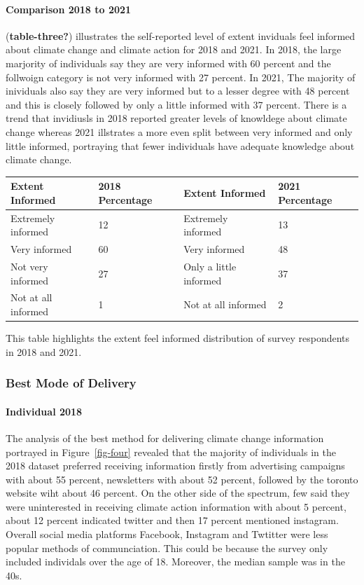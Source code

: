 \documentclass[
  letterpaper,
  DIV=11,
  numbers=noendperiod]{scrartcl}
\let\oldparagraph\paragraph
\renewcommand{\paragraph}[1]{\oldparagraph{#1}\mbox{}}
\begin{document}
\paragraph{Comparison 2018 to 2021}\label{comparison-2018-to-2021-2}

(\textbf{table-three?}) illustrates the self-reported level of extent
inviduals feel informed about climate change and climate action for 2018
and 2021. In 2018, the large marjority of individuals say they are very
informed with 60 percent and the follwoign category is not very informed
with 27 percent. In 2021, The majority of inividuals also say they are
very informed but to a lesser degree with 48 percent and this is closely
followed by only a little informed with 37 percent. There is a trend
that invidiusls in 2018 reported greater levels of knowldege about
climate change whereas 2021 illstrates a more even split between very
informed and only little informed, portraying that fewer individuals
have adequate knowledge about climate change.

\begin{table}
\centering
\begin{tabular}[t]{l|l|l|l}
\hline
Extent Informed & 2018 Percentage & Extent Informed & 2021 Percentage\\
\hline
Extremely informed & 12 & Extremely informed & 13\\
\hline
Very informed & 60 & Very informed & 48\\
\hline
Not very informed & 27 & Only a little informed & 37\\
\hline
Not at all informed & 1 & Not at all informed & 2\\
\hline
\end{tabular}
\end{table}

This table highlights the extent feel informed distribution of survey
respondents in 2018 and 2021.

\subsubsection{Best Mode of Delivery}\label{best-mode-of-delivery}

\paragraph{Individual 2018}\label{individual-2018-3}

The analysis of the best method for delivering climate change
information portrayed in Figure~\ref{fig-four} revealed that the
majority of individuals in the 2018 dataset preferred receiving
information firstly from advertising campaigns with about 55 percent,
newsletters with about 52 percent, followed by the toronto website wiht
about 46 percent. On the other side of the spectrum, few said they were
uninterested in receiving climate action information with about 5
percent, about 12 percent indicated twitter and then 17 percent
mentioned instagram. Overall social media platforms Facebook, Instagram
and Twtitter were less popular methods of communciation. This could be
because the survey only included individals over the age of 18.
Moreover, the median sample was in the 40s.
\end{document}
